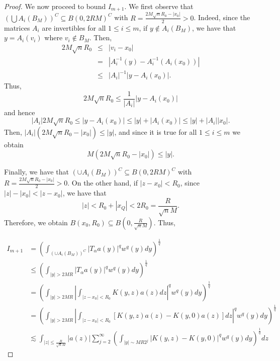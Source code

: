 \documentclass[a4paper,12pt,reqno]{amsart}
\numberwithin{equation}{section}
\begin{document}
\begin{proof}
		
		
		We now proceed to bound $I_{m+1}$.  We  first observe that
		$(\bigcup A_i(B_M))^{C} \subseteq B(0,2RM)^{C}$ with $R=\frac{2M \sqrt{n}R_0-|x_0|}{2} > 0 $.
		Indeed, since the matrices $A_i$ are invertibles for all $1 \leq i \le m$, if $y \notin A_i(B_M)$, we have that $y=A_i(v_i)$ where $v_i \notin B_M$. Then, 
		\begin{eqnarray*}
			2M \sqrt{n}R_0 &\leq &|v_i-x_0|\\
			&=&|A_i^{-1}(y)-A_i^{-1}(A_i(x_0))| \\
			&\leq &|A_i|^{-1} |y-A_i(x_0)|.
		\end{eqnarray*}
		Thus, 
		$$2M\sqrt{n}R_0 \leq \frac{1}{|A_i|} |y-A_i(x_0)|$$ 
		and hence  
		$$|A_i| 2M\sqrt{n}R_0 \leq |y-A_i(x_0)| \leq |y|+|A_i(x_0)| \leq |y| + |A_i| |x_0|.$$ 
		Then, $|A_i| (2M\sqrt{n}R_0-|x_0|) \leq |y|$, and since it is true for all  $1 \leq i  \leq m$ we obtain
		$$M(2M\sqrt{n}R_0-|x_0|) \leq |y|.$$
		
		Finally, we have that $(\cup A_i(B_M))^{C} \subseteq B(0,2RM)^{C}$ with $R=\frac{2M\sqrt{n}R_0-|x_0|}{2} > 0 $. On the other hand, if $|z-x_0|< R_0$, since $|z|-|x_0| <|z-x_0|$, we have that  
		$$ |z|  <  R_0 + |x_Q| < 2 R_0 = \frac{R}{\sqrt{n}M}.$$
		Therefore, we obtain $B(x_0, R_0) \subseteq B(0,\frac{R}{\sqrt{n}M})$. Thus,
		
		$$
		\begin{aligned}
			I_{m+1} &=  \left(\int_{(\cup A_i(B_M))^{C}} |T_\alpha a(y)|^q w^q(y)dy\right)^{\frac{1}{q}}\\
			&\leq \left(\int_{|y|> 2MR} |T_\alpha a(y)|^q w^q(y)dy\right)^{\frac{1}{q}}\\
			&=  \left(\int_{|y|> 2MR} \left |\int_{|z-x_0|< R_0} K(y,z) a(z) dz \right |^{q}
			w^q(y)dy\right)^{\frac{1}{q}}\\
			&=  \left(\int_{|y|> 2MR} \left |\int_{|z-x_0|< R_0} \left[ K(y,z) a(z)-K(y,0)a(z)\right] dz \right |^{q}
			w^q(y)dy\right)^{\frac{1}{q}}\\
			&\lesssim  \int _{|z|\leq \frac{R}{\sqrt{n}M}}|a(z)|\sum_{j=2}^\infty\left(\int_{|y|\sim M R2^{j}} |K(y,z)-K(y,0)|^q w^q(y) dy\right)^{\frac 1q}dz
		\end{aligned}
		$$
		

\end{proof}
\end{document}
